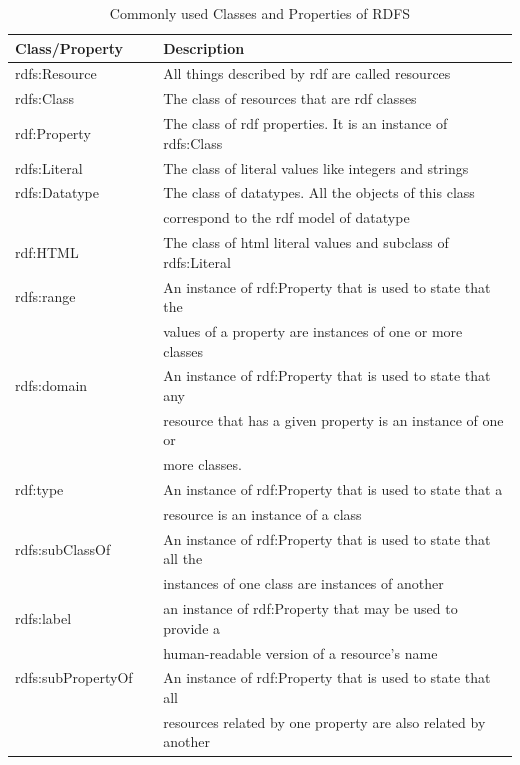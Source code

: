 \begin{doublespace}
\begin{table}[h!]
\centering
\begin{tabular}{| l | l |} 
 \hline
 Class/Property & Description  \\ 
 \hline
 rdfs:Resource & All things described by \ac{rdf} are called resources  \\ \hline
 rdfs:Class & The class of resources that are \ac{rdf} classes \\ \hline
 rdf:Property & The class of \ac{rdf} properties. It is an instance of rdfs:Class  \\ \hline
 rdfs:Literal & The class of literal values like integers and strings  \\ \hline
 rdfs:Datatype & The class of datatypes. All the objects of this class \\ & correspond to the \ac{rdf} model of datatype  \\ \hline
 rdf:HTML & The class of \ac{html} literal values and subclass of rdfs:Literal  \\ \hline
 rdfs:range & An instance of rdf:Property that is used to state that the \\ & values of a property are instances of one or more classes   \\ \hline
 rdfs:domain & An instance of rdf:Property that is used to state that any \\ & resource that has a given property is an instance of one or \\ & more classes. \\ \hline
 rdf:type & An instance of rdf:Property that is used to state that a \\ & resource is an instance of a class  \\ \hline
 rdfs:subClassOf & An instance of rdf:Property that is used to state that all the \\ & instances of one class are instances of another  \\ \hline
 rdfs:label & an instance of rdf:Property that may be used to provide a \\ &  human-readable version of a resource's name  \\ \hline
 rdfs:subPropertyOf \ \ & An instance of rdf:Property that is used to state that all \\ & resources related by one property are also related by another  \\ 
 \hline
\end{tabular}
\caption{Commonly used Classes and Properties of RDFS}
\label{table:2.1}
\end{table}

\end{doublespace}

